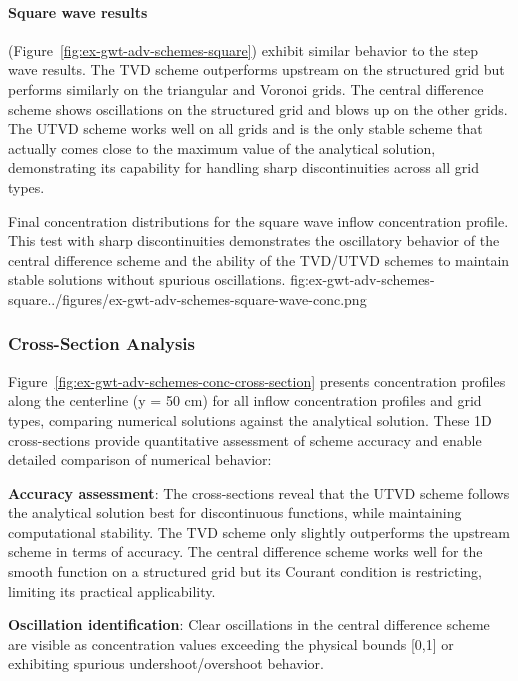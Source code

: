 \paragraph{Square wave results} (Figure~\ref{fig:ex-gwt-adv-schemes-square}) exhibit similar behavior to the step wave results. The TVD scheme outperforms upstream on the structured grid but performs similarly on the triangular and Voronoi grids. The central difference scheme shows oscillations on the structured grid and blows up on the other grids. The UTVD scheme works well on all grids and is the only stable scheme that actually comes close to the maximum value of the analytical solution, demonstrating its capability for handling sharp discontinuities across all grid types.
\begin{StandardFigure}{
    Final concentration distributions for the square wave inflow concentration profile. This test with sharp discontinuities demonstrates the oscillatory behavior of the central difference scheme and the ability of the TVD/UTVD schemes to maintain stable solutions without spurious oscillations.
}{fig:ex-gwt-adv-schemes-square}{../figures/ex-gwt-adv-schemes-square-wave-conc.png}
\end{StandardFigure}

\subsubsection{Cross-Section Analysis}

Figure~\ref{fig:ex-gwt-adv-schemes-conc-cross-section} presents concentration profiles along the centerline (y = 50 cm) for all inflow concentration profiles and grid types, comparing numerical solutions against the analytical solution. These 1D cross-sections provide quantitative assessment of scheme accuracy and enable detailed comparison of numerical behavior:

\textbf{Accuracy assessment}: The cross-sections reveal that the UTVD scheme follows the analytical solution best for discontinuous functions, while maintaining computational stability. The TVD scheme only slightly outperforms the upstream scheme in terms of accuracy. The central difference scheme works well for the smooth function on a structured grid but its Courant condition is restricting, limiting its practical applicability.

\textbf{Oscillation identification}: Clear oscillations in the central difference scheme are visible as concentration values exceeding the physical bounds [0,1] or exhibiting spurious undershoot/overshoot behavior.

